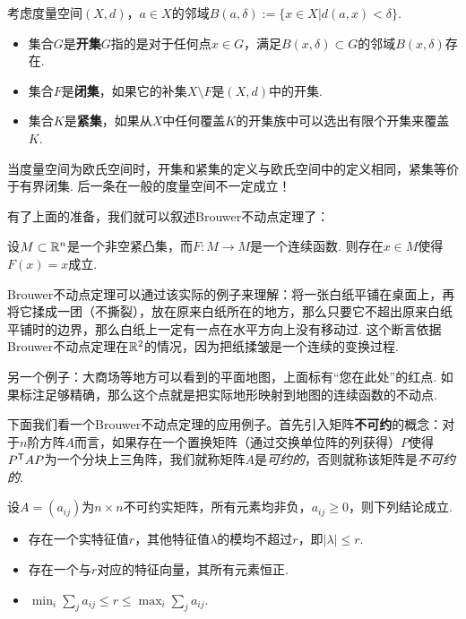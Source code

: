 \begin{definition}[开集、闭集和紧集]
    考虑度量空间$(X,d)$，$a\in X$的邻域$B(a,\delta):=\{x\in X|d(a,x)<\delta\}$.
\begin{itemize}
    \item 集合$G$是\textbf{开集}$G$指的是对于任何点$x\in G$，满足$B(x,\delta)\subset G$的邻域$B(x,\delta)$存在.
    \item 集合$F$是\textbf{闭集}，如果它的补集$X\setminus F$是$(X,d)$中的开集.
    \item 集合$K$是\textbf{紧集}，如果从$X$中任何覆盖$K$的开集族中可以选出有限个开集来覆盖$K$.
\end{itemize}
\end{definition}
当度量空间为欧氏空间时，开集和紧集的定义与欧氏空间中的定义相同，紧集等价于有界闭集. 后一条在一般的度量空间不一定成立！

有了上面的准备，我们就可以叙述Brouwer不动点定理了：

\begin{theorem}[Brouwer不动点定理]
    设$M\subset\mathbb{R}^n$是一个非空紧凸集，而$F:M\to M$是一个连续函数. 则存在$x\in M$使得$F(x)=x$成立.
\end{theorem}

Brouwer不动点定理可以通过该实际的例子来理解：将一张白纸平铺在桌面上，再将它揉成一团（不撕裂），放在原来白纸所在的地方，那么只要它不超出原来白纸平铺时的边界，那么白纸上一定有一点在水平方向上没有移动过. 这个断言依据Brouwer不动点定理在$\mathbb{R}^2$的情况，因为把纸揉皱是一个连续的变换过程.

另一个例子：大商场等地方可以看到的平面地图，上面标有“您在此处”的红点. 如果标注足够精确，那么这个点就是把实际地形映射到地图的连续函数的不动点.

下面我们看一个Brouwer不动点定理的应用例子。首先引入矩阵\textbf{不可约}的概念：对于$n$阶方阵$A$而言，如果存在一个置换矩阵（通过交换单位阵的列获得）$P$使得$P^{\mathsf{T}} AP$为一个分块上三角阵，我们就称矩阵$A$是\emph{可约的}，否则就称该矩阵是\emph{不可约的}.

\begin{theorem}
    设$A=(a_{ij})$为$n\times n$不可约实矩阵，所有元素均非负，$a_{ij}\ge 0$，则下列结论成立.
    \begin{itemize}
        \item 存在一个实特征值$r$，其他特征值$\lambda$的模均不超过$r$，即$|\lambda|\le r$.
        \item 存在一个与$r$对应的特征向量，其所有元素恒正.
        \item $\min_i\sum_{j}a_{ij}\le r\le \max_i\sum_j a_{ij}$.
    \end{itemize}
\end{theorem}


